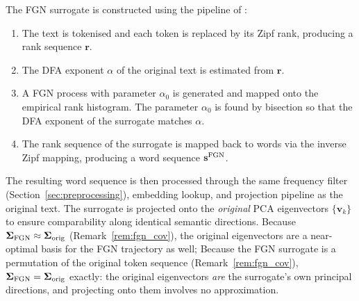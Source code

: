 \documentclass[12pt,a4paper]{article}
\newcommand{\vk}{\mathbf{v}_k}
\newcommand{\Sig}{\boldsymbol{\Sigma}}
\begin{document}
The FGN surrogate is constructed using the pipeline of
\citet{DegliEsposti2025}:
\begin{enumerate}
  \item The text is tokenised and each token is replaced by its Zipf
        rank, producing a rank sequence $\mathbf{r}$.
  \item The DFA exponent $\alpha$ of the original text is estimated
        from $\mathbf{r}$.
  \item A FGN process with parameter $\alpha_0$ is generated and
        mapped onto the empirical rank histogram.
        The parameter $\alpha_0$ is found by bisection so that the
        DFA exponent of the surrogate matches $\alpha$.
  \item The rank sequence of the surrogate is mapped back to words via
        the inverse Zipf mapping, producing a word sequence
        $\mathbf{s}^{\rm FGN}$.
\end{enumerate}
The resulting word sequence is then processed through the same
frequency filter (Section~\ref{sec:preprocessing}), embedding
lookup, and projection pipeline as the original text.
The surrogate is projected onto the \emph{original} PCA eigenvectors
$\{\vk\}$ to ensure comparability along identical semantic directions.
Because $\Sig_{\rm FGN} \approx \Sig_{\rm orig}$ (Remark~\ref{rem:fgn_cov}),
the original eigenvectors are a near-optimal basis for the FGN
trajectory as well; 
Because the FGN surrogate is a permutation of the original token
sequence (Remark~\ref{rem:fgn_cov}), $\Sig_{\rm FGN}=\Sig_{\rm orig}$
exactly: the original eigenvectors \emph{are} the surrogate's own
principal directions, and projecting onto them involves no
approximation.

%
%
\end{document}
